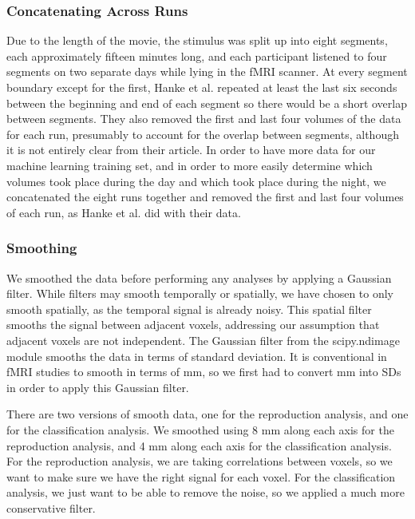 \subsubsection{Concatenating Across Runs}
Due to the length of the movie, the stimulus was split up into eight segments,  
each approximately fifteen minutes long, and each participant listened to four  
segments on two separate days while lying in the fMRI scanner.  At every        
segment boundary except for the first, Hanke et al. repeated at least the last 
six seconds between the beginning and end of each segment so there would be a 
short overlap between segments.  They also removed the first and last four 
volumes of the data for each run, presumably to account for the overlap 
between segments, although it is not entirely clear from their article.  In 
order to have more data for our machine learning training set, and in order to 
more easily determine which volumes took place during the day and which took 
place during the night, we concatenated the eight runs together and removed the
first and last four volumes of each run, as Hanke et al. did with their data.

\subsubsection{Smoothing}

We smoothed the data before performing any analyses by applying a Gaussian      
filter.  While filters may smooth temporally or spatially, we have chosen to    
only smooth spatially, as the temporal signal is already noisy.  This spatial  
filter smooths the signal between adjacent voxels, addressing                   
our assumption that adjacent voxels are not independent.  The   
Gaussian filter from the scipy.ndimage module smooths the data in terms of      
standard deviation.  It is conventional in fMRI studies to smooth in terms of mm, 
so we first had to convert mm into SDs in order to apply this  
Gaussian filter.

There are two versions of smooth data, one for the reproduction analysis, and
one for the classification analysis.  We smoothed using 8 mm along each axis
for the reproduction analysis, and 4 mm along each axis for the classification
analysis.  For the reproduction analysis, we are taking correlations between
voxels, so we want to make sure we have the right signal for each voxel.  For the classification analysis, we just want to be able to remove the noise, so we 
applied a much more conservative filter.

